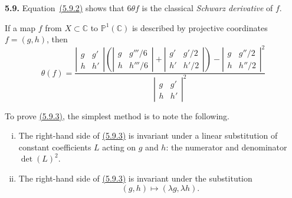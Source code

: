 \documentclass{report}
\newenvironment{rmenv}[1]
  {\phantomsection\par\medskip\noindent\textbf{#1.}\rmfamily}
  {\par\medskip}
\newcommand{\PP}{\mathbb{P}}
\newcommand{\CC}{\mathbb{C}}
\newcommand{\oldpage}[1]{\marginpar{\footnotesize$\Big\vert$ \textit{p.~#1}}}
\begin{document}
\begin{rmenv}{5.9}
  Equation~\hyperref[I.5.9.2]{(5.9.2)} shows that $6\theta f$ is the classical \emph{Schwarz derivative} of $f$.

  \bigskip

  If a map $f$ from $X\subset\CC$ to $\PP^1(\CC)$ is described by projective coordinates $f=(g,h)$, then
  \[
  \label{I.5.9.3}
    \theta(f) =
    \frac{
      \left\vert
        \begin{array}{cc}
          g&g'\\h&h'
        \end{array}
      \right\vert
      \left(
        \left\vert
          \begin{array}{cc}
            g&g'''/6\\h&h'''/6
          \end{array}
        \right\vert
        +
        \left\vert
          \begin{array}{cc}
            g'&g'/2\\h'&h'/2
          \end{array}
        \right\vert
      \right)
      -
      \left\vert
        \begin{array}{cc}
          g&g''/2\\h&h''/2
        \end{array}
      \right\vert^2
    }{
      \left\vert
        \begin{array}{cc}
          g&g'\\h&h'
        \end{array}
      \right\vert^2
    }
  \tag{5.9.3}
  \]

  To prove \hyperref[I.5.9.3]{(5.9.3)}, the simplest method is to note the following.
\oldpage{34}
  \begin{enumerate}[(i)]
    \item The right-hand side of \hyperref[I.5.9.3]{(5.9.3)} is invariant under a linear substitution of constant coefficients $L$ acting on $g$ and $h$: the numerator and denominator $\det(L)^2$.
    \item The right-hand side of \hyperref[I.5.9.3]{(5.9.3)} is invariant under the substitution
      \[
        (g,h) \mapsto (\lambda g,\lambda h).
      \]


\end{enumerate}
\end{rmenv}
\end{document}
